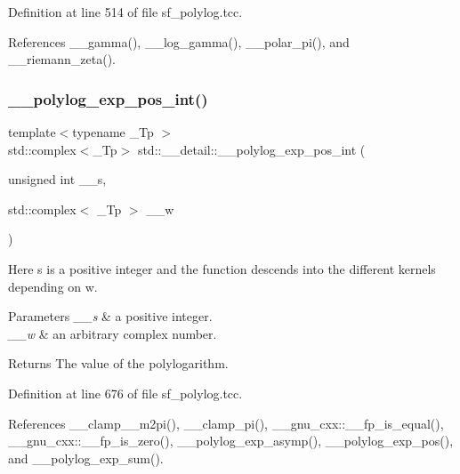 Definition at line 514 of file sf\+\_\+polylog.\+tcc.



References \+\_\+\+\_\+gamma(), \+\_\+\+\_\+log\+\_\+gamma(), \+\_\+\+\_\+polar\+\_\+pi(), and \+\_\+\+\_\+riemann\+\_\+zeta().

\mbox{\label{namespacestd_1_1____detail_a84081b0dd494f4601f2d40768e71b7b4}} 
\subsubsection{\texorpdfstring{\+\_\+\+\_\+polylog\+\_\+exp\+\_\+pos\+\_\+int()}{\_\_polylog\_exp\_pos\_int()}\hspace{0.1cm}{\footnotesize\ttfamily [1/2]}}
{\footnotesize\ttfamily template$<$typename \+\_\+\+Tp $>$ \\
std\+::complex$<$\+\_\+\+Tp$>$ std\+::\+\_\+\+\_\+detail\+::\+\_\+\+\_\+polylog\+\_\+exp\+\_\+pos\+\_\+int (\begin{DoxyParamCaption}\item[{unsigned int}]{\+\_\+\+\_\+s,  }\item[{std\+::complex$<$ \+\_\+\+Tp $>$}]{\+\_\+\+\_\+w }\end{DoxyParamCaption})}

Here s is a positive integer and the function descends into the different kernels depending on w.


\begin{DoxyParams}{Parameters}
{\em \+\_\+\+\_\+s} & a positive integer. \\
\hline
{\em \+\_\+\+\_\+w} & an arbitrary complex number. \\
\hline
\end{DoxyParams}
\begin{DoxyReturn}{Returns}
The value of the polylogarithm. 
\end{DoxyReturn}


Definition at line 676 of file sf\+\_\+polylog.\+tcc.



References \+\_\+\+\_\+clamp\+\_\+\_\+m2pi(), \+\_\+\+\_\+clamp\+\_\+pi(), \+\_\+\+\_\+gnu\+\_\+cxx\+::\+\_\+\+\_\+fp\+\_\+is\+\_\+equal(), \+\_\+\+\_\+gnu\+\_\+cxx\+::\+\_\+\+\_\+fp\+\_\+is\+\_\+zero(), \+\_\+\+\_\+polylog\+\_\+exp\+\_\+asymp(), \+\_\+\+\_\+polylog\+\_\+exp\+\_\+pos(), and \+\_\+\+\_\+polylog\+\_\+exp\+\_\+sum().



